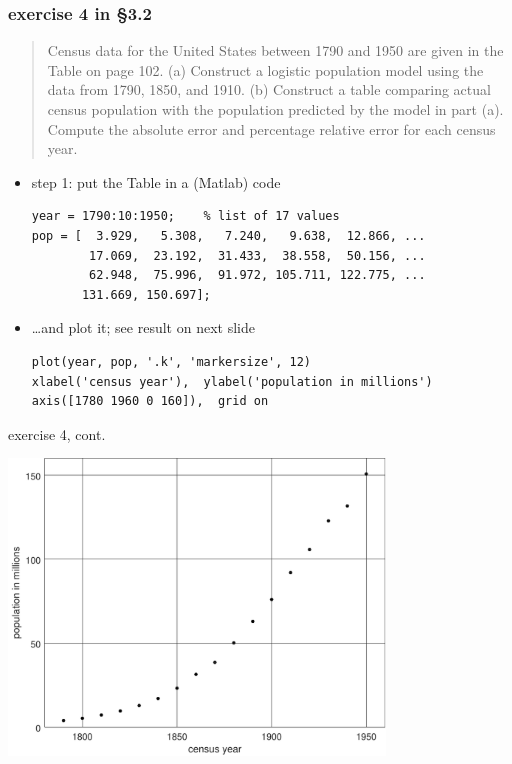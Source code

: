 \documentclass{beamer}
\begin{document}
\begin{frame}[fragile]

\frametitle{exercise 4 in \S3.2}

\small
\begin{quotation}
\noindent Census data for the United States between 1790 and 1950 are given in the Table on page 102.  (a)  Construct a logistic population model using the data from 1790, 1850, and 1910.  (b)  Construct a table comparing actual census population with the population predicted by the model in part (a).  Compute the absolute error and percentage relative error for each census year. 
\end{quotation}

\normalsize
\begin{itemize}
\item step 1: put the Table in a (Matlab) code

\begin{Verbatim}[fontsize=\scriptsize]
year = 1790:10:1950;    % list of 17 values
pop = [  3.929,   5.308,   7.240,   9.638,  12.866, ...
        17.069,  23.192,  31.433,  38.558,  50.156, ...
        62.948,  75.996,  91.972, 105.711, 122.775, ...
       131.669, 150.697];
\end{Verbatim}

\item \dots and plot it; see result on next slide

\begin{Verbatim}[fontsize=\scriptsize]
plot(year, pop, '.k', 'markersize', 12)
xlabel('census year'),  ylabel('population in millions')
axis([1780 1960 0 160]),  grid on
\end{Verbatim}
\end{itemize}
\end{frame}


\begin{frame}{exercise 4, cont.}

\begin{center}
\includegraphics[width=0.75\textwidth]{figs/uscensus}
\end{center}
\end{frame}
\end{document}
